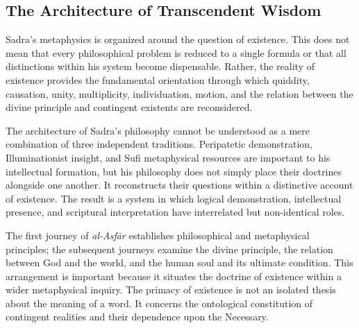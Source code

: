 


\subsection{The Architecture of Transcendent Wisdom}
\label{subsec:ch08_s17_ss03}

\label{para:VS.B01.P01.C08.S17.SS03.P001}

Sadra's metaphysics is organized around the
question of existence. This does not mean
that every philosophical problem is reduced
to a single formula or that all distinctions
within his system become dispensable. Rather,
the reality of existence provides the
fundamental orientation through which
quiddity, causation, unity, multiplicity,
individuation, motion, and the relation
between the divine principle and contingent
existents are reconsidered.

\label{para:VS.B01.P01.C08.S17.SS03.P002}

The architecture of Sadra's philosophy
cannot be understood as a mere combination
of three independent traditions. Peripatetic
demonstration, Illuminationist insight, and
Sufi metaphysical resources are important
to his intellectual formation, but his
philosophy does not simply place their
doctrines alongside one another. It
reconstructs their questions within a
distinctive account of existence. The
result is a system in which logical
demonstration, intellectual presence,
and scriptural interpretation have
interrelated but non-identical roles.

\label{para:VS.B01.P01.C08.S17.SS03.P003}

The first journey of \textit{al-Asfār}
establishes philosophical and metaphysical
principles; the subsequent journeys examine
the divine principle, the relation between
God and the world, and the human soul and
its ultimate condition. This arrangement
is important because it situates the
doctrine of existence within a wider
metaphysical inquiry. The primacy of
existence is not an isolated thesis about
the meaning of a word. It concerns the
ontological constitution of contingent
realities and their dependence upon the
Necessary.


